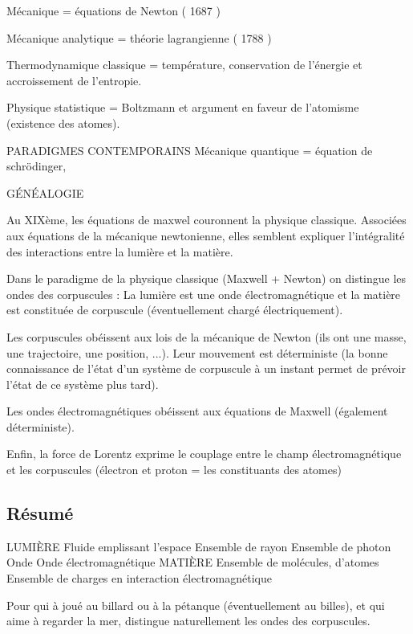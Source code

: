 	Mécanique = équations de Newton ( 1687 )

	Mécanique analytique = théorie lagrangienne ( 1788 )

	Thermodynamique classique = température, conservation de l'énergie et accroissement de l'entropie.

	Physique statistique = Boltzmann et argument en faveur de l'atomisme (existence des atomes).


PARADIGMES CONTEMPORAINS
	Mécanique quantique = équation de schrödinger, 

GÉNÉALOGIE

Au XIXème, les équations de maxwel couronnent la physique classique. Associées aux équations de la mécanique newtonienne, elles semblent expliquer l'intégralité des interactions entre la lumière et la matière.

Dans le paradigme de la physique classique (Maxwell + Newton) on distingue les ondes des corpuscules : La lumière est une onde électromagnétique et la matière est constituée de corpuscule (éventuellement chargé électriquement).

Les corpuscules obéissent aux lois de la mécanique de Newton (ils ont une masse, une trajectoire, une position, ...). Leur mouvement est déterministe (la bonne connaissance de l'état d'un système de corpuscule à un instant permet de prévoir l'état de ce système plus tard).

Les ondes électromagnétiques obéissent aux équations de Maxwell (également déterministe).

Enfin, la force de Lorentz exprime le couplage entre le champ électromagnétique et les corpuscules (électron et proton = les constituants des atomes)




\subsection{Résumé}

LUMIÈRE
	Fluide emplissant l'espace
	Ensemble de rayon
	Ensemble de photon
	Onde
	Onde électromagnétique
MATIÈRE
	Ensemble de molécules, d'atomes
	Ensemble de charges en interaction électromagnétique
	

Pour qui à joué au billard ou à la pétanque (éventuellement au billes), et qui aime à regarder la mer, distingue naturellement les ondes des corpuscules.


\subsection{}
\begin{center}
\end{center}

